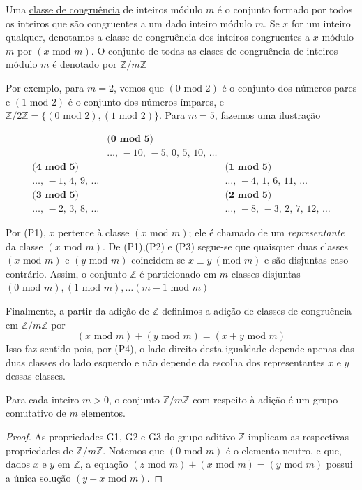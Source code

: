 \begin{definicao}
Uma \underline{classe de congruência} de inteiros módulo $m$ é o conjunto formado por todos os inteiros que são
congruentes a um dado inteiro módulo $m$. Se $x$ for um inteiro qualquer, denotamos a classe de congruência dos 
inteiros congruentes a $x$ módulo $m$ por $(x \text{ mod } m)$. O conjunto de todas as clases de congruência de inteiros
módulo $m$ é denotado por $\mathbb{Z}/m\mathbb{Z}$
\end{definicao}

Por exemplo, para $m = 2$, vemos que $(0 \text{ mod } 2)$ é o conjunto dos números pares e $(1 \text{ mod } 2)$ é o 
conjunto dos números ímpares, e $\mathbb{Z}/2\mathbb{Z} = \{ (0 \text{ mod } 2), (1 \text{ mod } 2) \}$. Para $m = 5$,
fazemos uma ilustração

\[
\begin{array}{ccc}
    & \textbf{(0 mod 5)} & \\[6pt]
    & \ldots,\,-10,\,-5,\,0,\,5,\,10,\,\ldots & \\[12pt]

\textbf{(4 mod 5)} &  & \textbf{(1 mod 5)} \\[6pt]
\ldots,\,-1,\,4,\,9,\,\ldots &  & \ldots,\,-4,\,1,\,6,\,11,\,\ldots \\[12pt]

\textbf{(3 mod 5)} &  & \textbf{(2 mod 5)} \\[6pt]
\ldots,\,-2,\,3,\,8,\,\ldots &  & \ldots,\,-8,\,-3,\,2,\,7,\,12,\,\ldots
\end{array}
\]

Por (P1), $x$ pertence à classe $(x \text{ mod } m)$; ele é chamado de um \emph{representante} da classe $(x \text{ mod } m)$.
De (P1),(P2) e (P3) segue-se que quaisquer duas classes $(x \text{ mod } m)$ e $(y \text{ mod } m)$ coincidem se $x \equiv y \ (\text{mod } m)$
e são disjuntas caso contrário. Assim, o conjunto $\mathbb{Z}$ é particionado em $m$ classes disjuntas $(0 \text{ mod } m), (1 \text{ mod } m),
\ldots (m - 1 \text{ mod } m)$ 

Finalmente, a partir da adição de $\mathbb{Z}$ definimos a adição de classes de congruência em $\mathbb{Z}/m\mathbb{Z}$ por
\[
    (x \text{ mod } m) + (y \text{ mod } m) = (x + y \text{ mod } m)
\]
Isso faz sentido pois, por (P4), o lado direito desta igualdade depende apenas das duas classes do lado esquerdo e não depende da 
escolha dos representantes $x$ e $y$ dessas classes.

\begin{proposicao}
Para cada inteiro $m > 0$, o conjunto $\mathbb{Z}/m\mathbb{Z}$ com respeito à adição é um grupo comutativo de $m$ elementos.
\end{proposicao}

\begin{proof}
As propriedades G1, G2 e G3 do grupo aditivo $\mathbb{Z}$ implicam as respectivas propriedades de $\mathbb{Z}/m\mathbb{Z}$. Notemos
que $(0 \text{ mod } m)$ é o elemento neutro, e que, dados $x$ e $y$ em $\mathbb{Z}$, a equação $(z \text{ mod } m) + (x \text{ mod } m)
= (y \text{ mod } m)$ possui a única solução $(y - x \text{ mod } m)$.
\end{proof}
